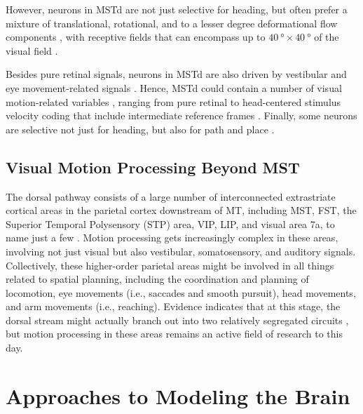 However, neurons in \ac{MSTd} are not just selective for heading,
but often prefer a mixture of translational, rotational, 
and to a lesser degree deformational flow components
\citep{DuffyWurtz1991a,DuffyWurtz1991b,Graziano1994,Mineault2012},
with receptive fields that can encompass up to 
$\SI{40}{\degree} \times \SI{40}{\degree}$ of the visual field \citep{Raiguel1997}.

Besides pure retinal signals, neurons in \ac{MSTd} are also driven by
vestibular \citep{PageDuffy2003,Gu2006,Takahashi2007,Gu2010}
and eye movement-related signals \citep{KomatsuWurtz1988,Newsome1988}.
Hence, \ac{MSTd} could contain a number of visual motion-related variables
\citep{BenHamed2003},
ranging from pure retinal to head-centered stimulus velocity coding
\citep{ChukoskieMovshon2009,Yu2010,Brostek2014}
that include intermediate reference frames \citep{Fetsch2007}.
Finally, some neurons are selective not just for heading, but also for
path and place \citep{FroehlerDuffy2002,Page2015}.


\subsection{Visual Motion Processing Beyond MST}

The dorsal pathway consists of a large number of interconnected
extrastriate cortical areas in the parietal cortex
downstream of \ac{MT}, including \ac{MST}, \ac{FST}, the
Superior Temporal Polysensory (STP) area,
\acf{VIP}, \acf{LIP}, and visual area 7a, to name just a few
\citep{Andersen1990,Boussaoud1990,LewisVanEssen2000,MaunsellVanEssen1983}.
Motion processing gets increasingly complex in these areas, involving
not just visual but also vestibular, somatosensory, and auditory signals.
Collectively, these higher-order parietal areas might be involved in
all things related to spatial planning, including the coordination and planning
of locomotion, eye movements (i.e., saccades and smooth pursuit),
head movements, and arm movements (i.e., reaching).
Evidence indicates that at this stage, the dorsal stream might
actually branch out into two relatively segregated circuits
\citep{RizzolattiMatelli2003}, but motion processing in these areas
remains an active field of research to this day.


\section{Approaches to Modeling the Brain}
\label{sec:BKG|approaches}

